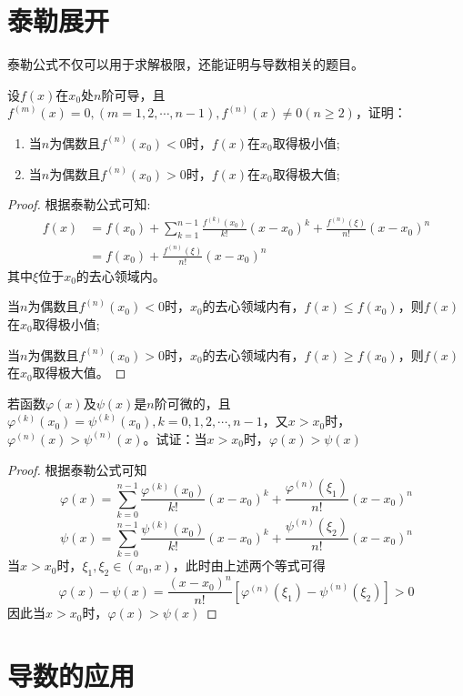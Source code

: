 \section{泰勒展开}
泰勒公式不仅可以用于求解极限，还能证明与导数相关的题目。
\begin{example}
    设$f(x)$在$x_0$处$n$阶可导，且$f^{(m)}(x)=0,(m=1,2,\cdots,n-1),f^{(n)}(x)\neq 0(n\geq 2)$，证明：
    \begin{enumerate}[(1)]
        \item 当$n$为偶数且$f^{(n)}(x_0)<0$时，$f(x)$在$x_0$取得极小值;
        \item 当$n$为偶数且$f^{(n)}(x_0)>0$时，$f(x)$在$x_0$取得极大值;
    \end{enumerate}
\end{example}
\begin{proof}
    根据泰勒公式可知:
    \begin{align*}
        f(x) & = f(x_0) + \sum_{k=1}^{n-1} \frac{f^{(k)}(x_0)}{k!}(x-x_0)^k + \frac{f^{(n)}(\xi)}{n!}(x-x_0)^n \\
             & = f(x_0) +  \frac{f^{(n)}(\xi)}{n!}(x-x_0)^n
    \end{align*}
    其中$\xi$位于$x_0$的去心领域内。

    当$n$为偶数且$f^{(n)}(x_0)<0$时，$x_0$的去心领域内有，$f(x) \leq f(x_0)$，则$f(x)$在$x_0$取得极小值;

    当$n$为偶数且$f^{(n)}(x_0)>0$时，$x_0$的去心领域内有，$f(x) \geq f(x_0)$，则$f(x)$在$x_0$取得极大值。
\end{proof}

\begin{example}
    若函数$\varphi(x)$及$\psi(x)$是$n$阶可微的，且$\varphi^{(k)}(x_0)=\psi^{(k)}(x_0),k=0,1,2,\cdots,n-1$，又$x>x_0$时，
    $\varphi^{(n)}(x)>\psi^{(n)}(x)$。试证：当$x>x_0$时，$\varphi(x)>\psi(x)$
\end{example}
\begin{proof}
    根据泰勒公式可知
    \[ \varphi(x) = \sum_{k=0}^{n-1}\frac{\varphi^{(k)}(x_0)}{k!}(x-x_0)^k + \frac{\varphi^{(n)}(\xi_1)}{n!}(x-x_0)^n \]
    \[ \psi(x) = \sum_{k=0}^{n-1}\frac{\psi^{(k)}(x_0)}{k!}(x-x_0)^k + \frac{\psi^{(n)}(\xi_2)}{n!}(x-x_0)^n \]
    当$x>x_0$时，$\xi_1,\xi_2\in(x_0,x)$，此时由上述两个等式可得
    \[ \varphi(x) - \psi(x) = \frac{(x-x_0)^n}{n!}[\varphi^{(n)}(\xi_1) - \psi^{(n)}(\xi_2)] > 0\]
    因此当$x>x_0$时，$\varphi(x)>\psi(x)$
\end{proof}

\section{导数的应用}
